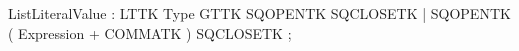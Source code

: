 %
%
%
\begin{rail}
ListLiteralValue : LTTK Type GTTK SQOPENTK SQCLOSETK
                 | SQOPENTK ( Expression + COMMATK ) SQCLOSETK
                 ;
\end{rail}
